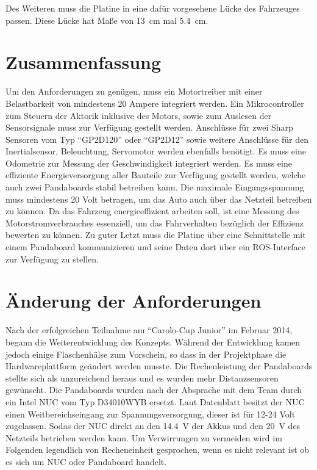 Des Weiteren muss die Platine in eine dafür vorgesehene Lücke des Fahrzeuges passen. Diese Lücke hat Maße von \SI{13}{\cm} mal \SI{5,4}{\cm}.


\section{Zusammenfassung}
Um den Anforderungen zu genügen, muss ein Motortreiber mit einer Belastbarkeit von mindestens 20 Ampere integriert werden. 
Ein Mikrocontroller zum Steuern der Aktorik inklusive des Motors, sowie zum Auslesen der Sensorsignale muss zur Verfügung gestellt werden. 
Anschlüsse für zwei Sharp Sensoren vom Typ ``GP2D120'' oder ``GP2D12'' sowie weitere Anschlüsse für den Inertialsensor, Beleuchtung, Servomotor werden ebenfalls benötigt. 
Es muss eine Odometrie zur Messung der Geschwindigkeit integriert werden.
Es muss eine effiziente Energieversorgung aller Bauteile zur Verfügung gestellt werden, welche auch zwei Pandaboards stabil betreiben kann. Die maximale Eingangsspannung
muss mindestens 20 Volt betragen, um das Auto auch über das Netzteil betreiben zu können.
Da das Fahrzeug energieeffizient arbeiten soll, ist eine Messung des Motorstromverbrauches essenziell, um das Fahrverhalten bezüglich der Effizienz bewerten zu können.
Zu guter Letzt muss die Platine über eine Schnittstelle mit einem Pandaboard kommunizieren und seine Daten dort über ein ROS-Interface zur Verfügung zu stellen.

\section{Änderung der Anforderungen}
Nach der erfolgreichen Teilnahme am ``Carolo-Cup Junior'' im Februar 2014, begann die Weiterentwicklung des Konzepts. Während der Entwicklung kamen jedoch
einige Flaschenhälse zum Vorschein, so dass in der Projektphase die Hardwareplattform geändert werden musste. Die Rechenleistung der Pandaboards stellte sich
als unzureichend heraus und es wurden mehr Distanzsensoren gewünscht. Die Pandaboards wurden nach der Absprache mit dem Team durch ein Intel NUC vom Typ
D34010WYB ersetzt. Laut Datenblatt \cite{datasheet-nuc} besitzt der NUC einen Weitbereichseingang zur Spannungsversorgung, dieser ist für 12-24 Volt zugelassen.
Sodas der NUC direkt an den \SI{14,4}{\V} der Akkus und den \SI{20}{\V} des Netzteils betrieben werden kann. Um Verwirrungen zu vermeiden wird im Folgenden legendlich 
von Recheneinheit gesprochen, wenn es nicht relevant ist ob es sich um NUC oder Pandaboard handelt.

